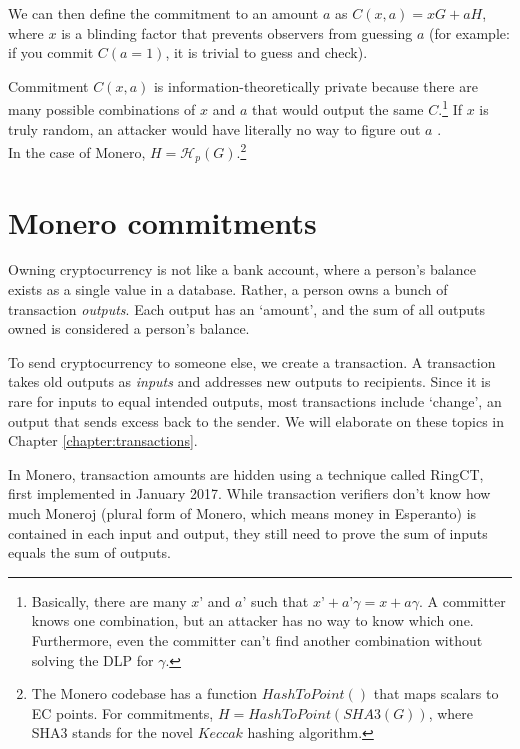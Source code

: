 We can then define the commitment to an amount \(a\) as \(C(x, a) = x G + a H\), where \(x\) is a blinding factor that prevents observers from guessing $a$ (for example: if you commit $C(a=1)$, it is trivial to guess and check). 

Commitment $C(x, a)$ is information-theoretically private because there are many possible combinations of $x$ and $a$ that would output the same $C$.\footnote{Basically, there are many $x’$ and $a’$ such that $x’+a’ \gamma = x+a \gamma$. A committer knows one combination, but an attacker has no way to know which one. Furthermore, even the committer can't find another combination without solving the DLP for $\gamma$.} If $x$ is truly random, an attacker would have literally no way to figure out $a$ \cite{maxwell-ct}.%
\\

In the case of Monero, $H = \mathcal{H}_p(G)$.\footnote{\label{hashtopoint_note}The Monero codebase has a function $HashToPoint()$ that maps scalars to EC points. For commitments, $H = HashToPoint(SHA3(G))$, where SHA3 stands for the novel $\mathit{Keccak}$ hashing algorithm.}




\section{Monero commitments}
\label{sec:pedersen_monero}

Owning cryptocurrency is not like a bank account, where a person’s balance exists as a single value in a database. Rather, a person owns a bunch of transaction {\em outputs}. Each output has an `amount’, and the sum of all outputs owned is considered a person’s balance.

To send cryptocurrency to someone else, we create a transaction. A transaction takes old outputs as {\em inputs} and addresses new outputs to recipients. Since it is rare for inputs to equal intended outputs, most transactions include `change’, an output that sends excess back to the sender. We will elaborate on these topics in Chapter \ref{chapter:transactions}.

In Monero, transaction amounts are hidden using a technique called RingCT, first implemented in January 2017. While transaction verifiers don’t know how much Moneroj (plural form of Monero, which means money in Esperanto) is contained in each input and output, they still need to prove the sum of inputs equals the sum of outputs. 

